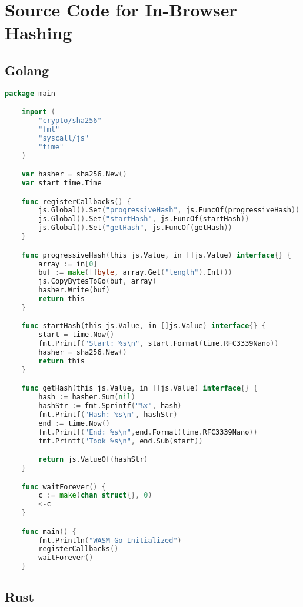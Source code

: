 \chapter{Source Code for In-Browser Hashing}\label{ch:in-browser-hashing-code}

\section{Golang}\label{sec:golang}

\begin{lstlisting}[language=Go]
    package main

    import (
        "crypto/sha256"
        "fmt"
        "syscall/js"
        "time"
    )

    var hasher = sha256.New()
    var start time.Time

    func registerCallbacks() {
        js.Global().Set("progressiveHash", js.FuncOf(progressiveHash))
        js.Global().Set("startHash", js.FuncOf(startHash))
        js.Global().Set("getHash", js.FuncOf(getHash))
    }

    func progressiveHash(this js.Value, in []js.Value) interface{} {
        array := in[0]
        buf := make([]byte, array.Get("length").Int())
        js.CopyBytesToGo(buf, array)
        hasher.Write(buf)
        return this
    }

    func startHash(this js.Value, in []js.Value) interface{} {
        start = time.Now()
        fmt.Printf("Start: %s\n", start.Format(time.RFC3339Nano))
        hasher = sha256.New()
        return this
    }

    func getHash(this js.Value, in []js.Value) interface{} {
        hash := hasher.Sum(nil)
        hashStr := fmt.Sprintf("%x", hash)
        fmt.Printf("Hash: %s\n", hashStr)
        end := time.Now()
        fmt.Printf("End: %s\n",end.Format(time.RFC3339Nano))
        fmt.Printf("Took %s\n", end.Sub(start))

        return js.ValueOf(hashStr)
    }

    func waitForever() {
        c := make(chan struct{}, 0)
        <-c
    }

    func main() {
        fmt.Println("WASM Go Initialized")
        registerCallbacks()
        waitForever()
    }
\end{lstlisting}


\section{Rust}

